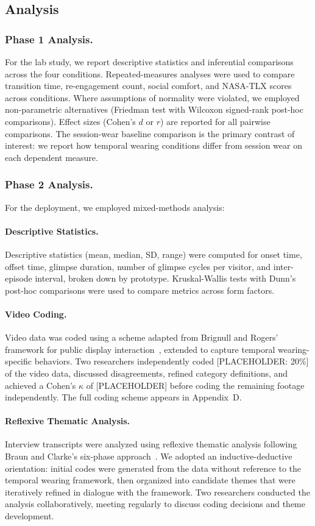 \subsection{Analysis}

\subsubsection{Phase 1 Analysis.}
For the lab study, we report descriptive statistics and inferential comparisons across the four conditions. Repeated-measures analyses were used to compare transition time, re-engagement count, social comfort, and NASA-TLX scores across conditions. Where assumptions of normality were violated, we employed non-parametric alternatives (Friedman test with Wilcoxon signed-rank post-hoc comparisons). Effect sizes (Cohen's $d$ or $r$) are reported for all pairwise comparisons. The session-wear baseline comparison is the primary contrast of interest: we report how temporal wearing conditions differ from session wear on each dependent measure.

\subsubsection{Phase 2 Analysis.}
For the deployment, we employed mixed-methods analysis:

\paragraph{Descriptive Statistics.}
Descriptive statistics (mean, median, SD, range) were computed for onset time, offset time, glimpse duration, number of glimpse cycles per visitor, and inter-episode interval, broken down by prototype. Kruskal-Wallis tests with Dunn's post-hoc comparisons were used to compare metrics across form factors.

\paragraph{Video Coding.}
Video data was coded using a scheme adapted from Brignull and Rogers' framework for public display interaction~\cite{brignull2003enticing}, extended to capture temporal wearing-specific behaviors. Two researchers independently coded [PLACEHOLDER: 20\%] of the video data, discussed disagreements, refined category definitions, and achieved a Cohen's $\kappa$ of [PLACEHOLDER] before coding the remaining footage independently. The full coding scheme appears in Appendix~D.

\paragraph{Reflexive Thematic Analysis.}
Interview transcripts were analyzed using reflexive thematic analysis following Braun and Clarke's six-phase approach~\cite{braun2006thematic}. We adopted an inductive-deductive orientation: initial codes were generated from the data without reference to the temporal wearing framework, then organized into candidate themes that were iteratively refined in dialogue with the framework. Two researchers conducted the analysis collaboratively, meeting regularly to discuss coding decisions and theme development.
